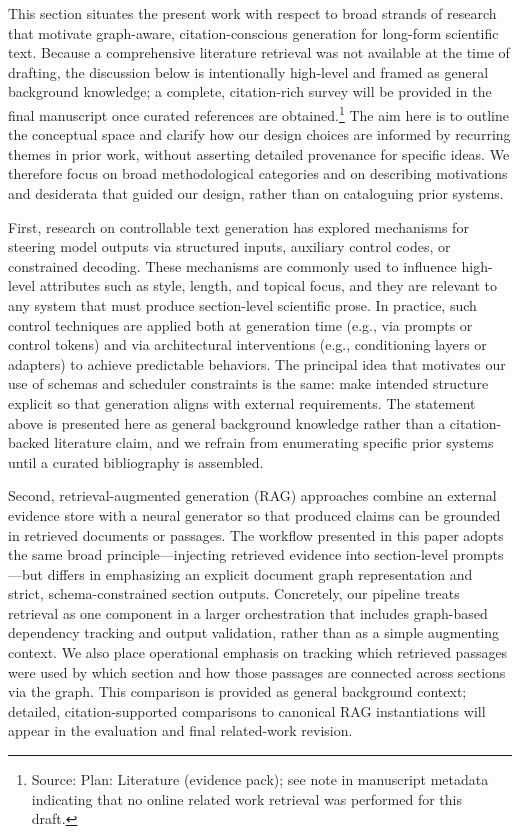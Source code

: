 This section situates the present work with respect to broad strands of research that motivate graph-aware, citation-conscious generation for long-form scientific text. Because a comprehensive literature retrieval was not available at the time of drafting, the discussion below is intentionally high-level and framed as general background knowledge; a complete, citation-rich survey will be provided in the final manuscript once curated references are obtained.\footnote{Source: Plan: Literature (evidence pack); see note in manuscript metadata indicating that no online related work retrieval was performed for this draft.} The aim here is to outline the conceptual space and clarify how our design choices are informed by recurring themes in prior work, without asserting detailed provenance for specific ideas. We therefore focus on broad methodological categories and on describing motivations and desiderata that guided our design, rather than on cataloguing prior systems.

First, research on controllable text generation has explored mechanisms for steering model outputs via structured inputs, auxiliary control codes, or constrained decoding. These mechanisms are commonly used to influence high-level attributes such as style, length, and topical focus, and they are relevant to any system that must produce section-level scientific prose. In practice, such control techniques are applied both at generation time (e.g., via prompts or control tokens) and via architectural interventions (e.g., conditioning layers or adapters) to achieve predictable behaviors. The principal idea that motivates our use of schemas and scheduler constraints is the same: make intended structure explicit so that generation aligns with external requirements. The statement above is presented here as general background knowledge rather than a citation-backed literature claim, and we refrain from enumerating specific prior systems until a curated bibliography is assembled.

Second, retrieval-augmented generation (RAG) approaches combine an external evidence store with a neural generator so that produced claims can be grounded in retrieved documents or passages. The workflow presented in this paper adopts the same broad principle—injecting retrieved evidence into section-level prompts—but differs in emphasizing an explicit document graph representation and strict, schema-constrained section outputs. Concretely, our pipeline treats retrieval as one component in a larger orchestration that includes graph-based dependency tracking and output validation, rather than as a simple augmenting context. We also place operational emphasis on tracking which retrieved passages were used by which section and how those passages are connected across sections via the graph. This comparison is provided as general background context; detailed, citation-supported comparisons to canonical RAG instantiations will appear in the evaluation and final related-work revision.

